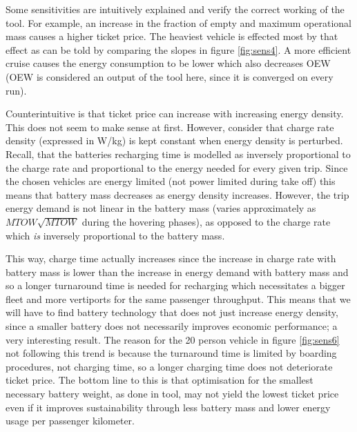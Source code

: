 \begin{figure}[H]
\begin{subfigure}[t]{0.33\textwidth}
    \captionsetup{justification=centering}
    \caption{}
    \label{fig:sens3}
\end{subfigure}
\captionsetup{justification=centering}
\caption{}
\label{fig:sens123}
\end{figure}


Some sensitivities are intuitively explained and verify the correct working of the tool. For example, an increase in the fraction of empty and maximum operational mass causes a higher ticket price. The heaviest vehicle is effected most by that effect as can be told by comparing the slopes in figure \ref{fig:sens4}. A more efficient cruise causes the energy consumption to be lower which also decreases OEW (OEW is considered an output of the tool here, since it is converged on every run). 

Counterintuitive is that ticket price can increase with increasing energy density. This does not seem to make sense at first. However, consider that charge rate density (expressed in W/kg) is kept constant when energy density is perturbed. Recall, that the batteries recharging time is modelled as inversely proportional to the charge rate and proportional to the energy needed for every given trip. Since the chosen vehicles are energy limited (not power limited during take off) this means that battery mass decreases as energy density increases. However, the trip energy demand is not linear in the battery mass (varies approximately as $MTOW\sqrt{MTOW}$ during the hovering phases), as opposed to the charge rate which \emph{is} inversely proportional to the battery mass.

This way, charge time actually increases since the increase in charge rate with battery mass is lower than the increase in energy demand with battery mass and so a longer turnaround time is needed for recharging which necessitates a bigger fleet and more vertiports for the same passenger throughput. This means that we will have to find battery technology that does not just increase energy density, since a smaller battery does not necessarily improves economic performance; a very interesting result. The reason for the 20 person vehicle in figure \ref{fig:sens6} not following this trend is because the turnaround time is limited by boarding procedures, not charging time, so a longer charging time does not deteriorate ticket price. The bottom line to this is that optimisation for the smallest necessary battery weight, as done in tool, may not yield the lowest ticket price even if it improves sustainability through less battery mass and lower energy usage per passenger kilometer.

